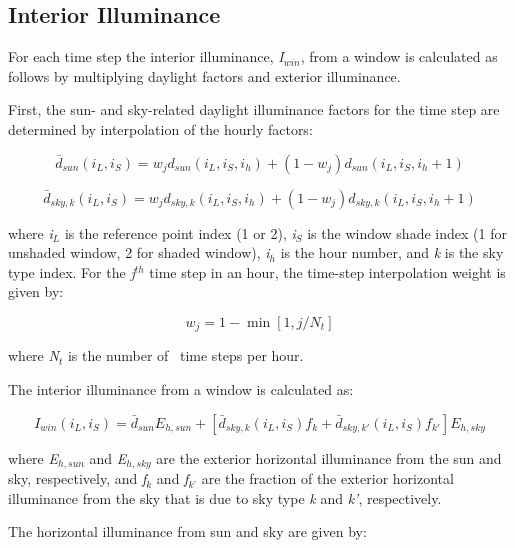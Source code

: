 \subsection{Interior Illuminance}\label{interior-illuminance}

For each time step the interior illuminance, \emph{I\(_{win}\)}, from a window is calculated as follows by multiplying daylight factors and exterior illuminance.

First, the sun- and sky-related daylight illuminance factors for the time step are determined by interpolation of the hourly factors:

\begin{equation}
{\bar d_{sun}}({i_L},{i_S}) = {w_j}{d_{sun}}({i_L},{i_S},{i_h}) + (1 - {w_j}){d_{sun}}({i_L},{i_S},{i_h} + 1)
\end{equation}

\begin{equation}
{\bar d_{sky,k}}({i_L},{i_S}) = {w_j}{d_{sky,k}}({i_L},{i_S},{i_h}) + (1 - {w_j}){d_{sky,k}}({i_L},{i_S},{i_h} + 1)
\end{equation}

where \emph{i\(_{L}\)} is the reference point index (1 or 2), \emph{i\(_{S}\)} is the window shade index (1 for unshaded window, 2 for shaded window), \emph{i\(_{h}\)} is the hour number, and \emph{k} is the sky type index. For the \emph{j\(^{th}\)} time step in an hour, the time-step interpolation weight is given by:

\begin{equation}
{w_j} = 1 - \min [1,j/{N_t}]
\end{equation}

where \emph{N\(_{t}\)} is the number of~ time steps per hour.

The interior illuminance from a window is calculated as:

\begin{equation}
{I_{win}}({i_L},{i_S}) = {\bar d_{sun}}{E_{h,sun}} + [{\bar d_{sky,k}}({i_L},{i_S}){f_k} + {\bar d_{sky,k'}}({i_L},{i_S}){f_{k'}}]{E_{h,sky}}
\end{equation}

where \emph{E\(_{h,sun}\)} and \emph{E\(_{h,sky}\)} are the exterior horizontal illuminance from the sun and sky, respectively, and \emph{f\(_{k}\)} and \emph{f\(_{k’}\)} are the fraction of the exterior horizontal illuminance from the sky that is due to sky type \emph{k} and \emph{k'}, respectively.

The horizontal illuminance from sun and sky are given by:

